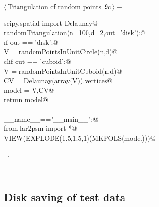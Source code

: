 \documentclass[11pt,oneside]{article}	%
\begin{document}
\begin{flushleft} \small
\begin{minipage}{\linewidth} \label{scrap18}
\protect{}$\langle\,$Triangulation of random points\nobreak\ {\footnotesize 9c}$\,\rangle\equiv$
\vspace{-1ex}
\begin{list}{}{} \item
\mbox{}\verb@from scipy.spatial import Delaunay@\\
\mbox{}\verb@def randomTriangulation(n=100,d=2,out='disk'):@\\
\mbox{}\verb@   if out == 'disk':@\\
\mbox{}\verb@      V = randomPointsInUnitCircle(n,d)@\\
\mbox{}\verb@   elif out == 'cuboid':@\\
\mbox{}\verb@      V = randomPointsInUnitCuboid(n,d)@\\
\mbox{}\verb@   CV = Delaunay(array(V)).vertices@\\
\mbox{}\verb@   model = V,CV@\\
\mbox{}\verb@   return model@\\
\mbox{}\verb@@\\
\mbox{}\verb@if __name__=="__main__":@\\
\mbox{}\verb@   from lar2psm import *@\\
\mbox{}\verb@   VIEW(EXPLODE(1.5,1.5,1)(MKPOLS(model)))@\\
\mbox{}\verb@@{\NWsep}
\end{list}
\vspace{-1ex}
\footnotesize\addtolength{\baselineskip}{-1ex}
\begin{list}{}{\setlength{\itemsep}{-\parsep}\setlength{\itemindent}{-\leftmargin}}
\item \NWtxtMacroRefIn\ .
\end{list}
\end{minipage}\\[4ex]
\end{flushleft}

\subsection{Disk saving of test data}
\end{document}
